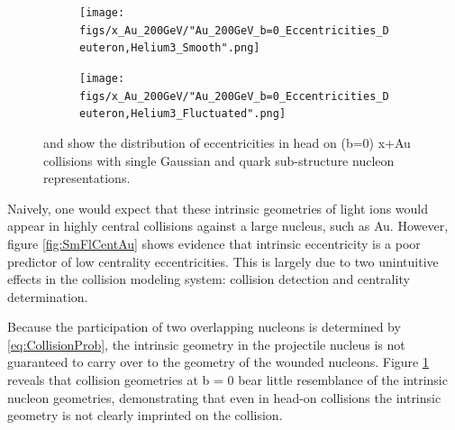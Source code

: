 \documentclass[twocolumn,showpacs,amsfonts,aps,prc,nofootinbib,floatfix]{revtex4}
\begin{document}
\begin{figure}
	\begin{center}
		\begin{subfigure}[t]{0.4\linewidth}
			\texttt{[image: figs/x\_Au\_200GeV/"Au\_200GeV\_b=0\_Eccentricities\_Deuteron,Helium3\_Smooth".png]}
		\end{subfigure}
		\begin{subfigure}[t]{0.4\linewidth}
			\texttt{[image: figs/x\_Au\_200GeV/"Au\_200GeV\_b=0\_Eccentricities\_Deuteron,Helium3\_Fluctuated".png]}
		\end{subfigure}
		\caption{ and  show the distribution of eccentricities in head on (b=0) x+Au collisions with single Gaussian and quark sub-structure nucleon representations.}
		\label{fig:SmFlAub=0}
	\end{center}
\end{figure}

Naively, one would expect that these intrinsic geometries of light ions would appear in highly central collisions against a large nucleus, such as Au. However, figure \ref{fig:SmFlCentAu} shows evidence that intrinsic eccentricity is a poor predictor of low centrality eccentricities. This is largely due to two unintuitive effects in the collision modeling system: collision detection and centrality determination. 

Because the participation of two overlapping nucleons is determined by \ref{eq:CollisionProb}, the intrinsic geometry in the projectile nucleus is not guaranteed to carry over to the geometry of the wounded nucleons. Figure \ref{fig:SmFlAub=0} reveals that collision geometries at b = 0 bear little resemblance of the intrinsic nucleon geometries, demonstrating that even in head-on collisions the intrinsic geometry is not clearly imprinted on the collision.
\end{document}
